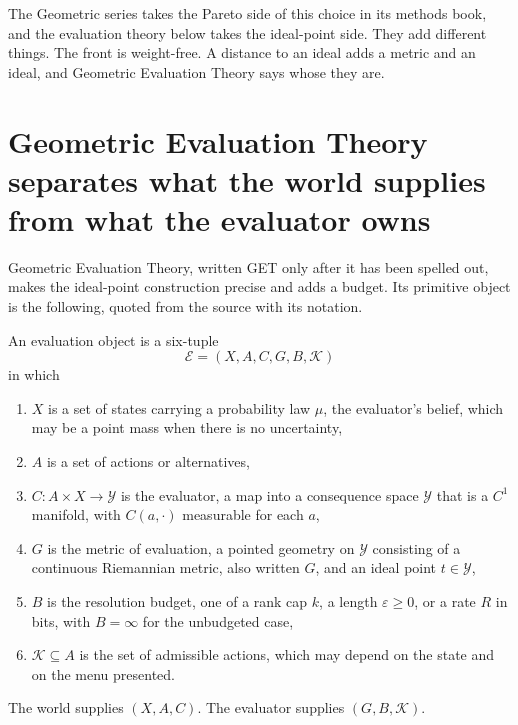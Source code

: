 The Geometric series takes the Pareto side of this choice in its methods book, and the evaluation theory below takes the ideal-point side. They add different things. The front is weight-free. A distance to an ideal adds a metric and an ideal, and Geometric Evaluation Theory says whose they are.



\section{Geometric Evaluation Theory separates what the world supplies from what the evaluator owns}\label{sec:ch08:get}

Geometric Evaluation Theory, written GET only after it has been spelled out, makes the ideal-point construction precise and adds a budget. Its primitive object is the following, quoted from the source with its notation.

\begin{definition}\label{def:ch08:get}
An evaluation object is a six-tuple
\begin{equation}\label{eq:ch08:getobject}
\mathcal E=(X,A,C,G,B,\mathcal K)
\end{equation}
in which
\begin{enumerate}[label=(\roman*)]
\item $X$ is a set of states carrying a probability law $\mu$, the evaluator's belief, which may be a point mass when there is no uncertainty,
\item $A$ is a set of actions or alternatives,
\item $C:A\times X\to\mathcal Y$ is the evaluator, a map into a consequence space $\mathcal Y$ that is a $C^1$ manifold, with $C(a,\cdot)$ measurable for each $a$,
\item $G$ is the metric of evaluation, a pointed geometry on $\mathcal Y$ consisting of a continuous Riemannian metric, also written $G$, and an ideal point $t\in\mathcal Y$,
\item $B$ is the resolution budget, one of a rank cap $k$, a length $\varepsilon\ge0$, or a rate $R$ in bits, with $B=\infty$ for the unbudgeted case,
\item $\mathcal K\subseteq A$ is the set of admissible actions, which may depend on the state and on the menu presented.
\end{enumerate}
The world supplies $(X,A,C)$. The evaluator supplies $(G,B,\mathcal K)$.
\end{definition}

